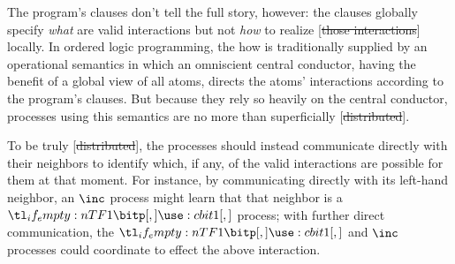 \documentclass[
  class=../hdeyoung-proposal,
  crop=false
]{standalone}
\begin{document}
The program's clauses don't tell the full story, however:
the clauses globally specify \emph{what} are valid interactions but not \emph{how} to realize [\st{those interactions}] locally.
In ordered logic programming, the how is traditionally supplied by an operational semantics in which an omniscient central conductor, having the benefit of a global view of all atoms, directs the atoms' interactions according to the program's clauses.
But because they rely so heavily on the central conductor, processes using this semantics are no more than superficially [\st{distributed}].


To be truly [\st{distributed}], the processes should instead communicate directly with their neighbors to identify which, if any, of the valid interactions are possible for them at that moment.
For instance, by communicating directly with its left-hand neighbor, an $\inc$ process might learn that that neighbor is a $\bit{1}$ process; with further direct communication, the $\bit{1}$ and $\inc$ processes could coordinate to effect the above interaction.
\end{document}
